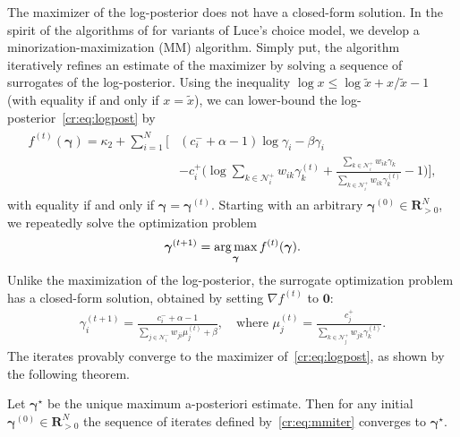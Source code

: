 The maximizer of the log-posterior does not have a closed-form solution.
In the spirit of the algorithms of \citet{hunter2004mm} for variants of Luce's choice model, we develop a minorization-maximization (MM) algorithm.
Simply put, the algorithm iteratively refines an estimate of the maximizer by solving a sequence of surrogates of the log-posterior.
Using the inequality $\log x \le \log \tilde{x} + x/\tilde{x} - 1$ (with equality if and only if $x = \tilde{x}$), we can lower-bound the log-posterior~\eqref{cr:eq:logpost} by
\begin{align}
\label{cr:eq:minorizing}
\begin{aligned}
f^{(t)}(\bm{\gamma}) = \kappa_2 + \sum_{i = 1}^N \bigg[
    & (c^-_i + \alpha - 1) \log \gamma_i - \beta \gamma_i \\
    &- c^+_i \bigg( \log\!\sum_{k \in \mathcal{N}^+_i}\!w_{ik} \gamma^{(t)}_k
                   +\frac{\sum_{k \in \mathcal{N}^+_i}\!w_{ik} \gamma_k}{\sum_{k \in \mathcal{N}^+_i}\!w_{ik} \gamma^{(t)}_k} -1 \bigg) \bigg],
\end{aligned}
\end{align}
with equality if and only if $\bm{\gamma} = \bm{\gamma}^{(t)}$.
Starting with an arbitrary $\bm{\gamma}^{(0)} \in \mathbf{R}^N_{>0}$, we repeatedly solve the optimization problem
\begin{align*}
\bm{\gamma}^{(t+1)} = \operatorname*{arg\,max}_{\bm{\gamma}} f^{(t)}(\bm{\gamma}).
\end{align*}
Unlike the maximization of the log-posterior, the surrogate optimization problem has a closed-form solution, obtained by setting $\nabla f^{(t)}$ to $\bm{0}$:
\begin{align}
\label{cr:eq:mmiter}
\gamma_i^{(t + 1)} = \frac{c^-_i + \alpha - 1}{\sum_{j \in \mathcal{N}^-_i} w_{ji} \mu_j^{(t)} + \beta},
    \quad \text{where }
    \mu_j^{(t)} = \frac{c^+_j}{\sum_{k \in \mathcal{N}^+_j} w_{jk} \gamma_k^{(t)}}.
\end{align}
The iterates provably converge to the maximizer of~\eqref{cr:eq:logpost}, as shown by the following theorem.

\begin{theorem}
\label{cr:thm:mmconv}
Let $\bm{\gamma}^\star$ be the unique maximum a-posteriori estimate.
Then for any initial $\bm{\gamma}^{(0)} \in \mathbf{R}^N_{> 0}$ the sequence of iterates defined by~\eqref{cr:eq:mmiter} converges to $\bm{\gamma}^\star$.
\end{theorem}

